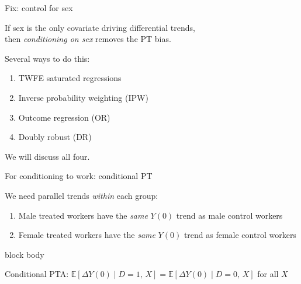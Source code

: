 \documentclass[aspectratio=169,11pt]{beamer}
\newcommand{\emphbox}[1]{%
  \begin{beamercolorbox}[rounded=true,sep=7pt,wd=\linewidth]{block body}%
    \small\color{slate}\raggedright #1%
  \end{beamercolorbox}}
\begin{document}
\begin{frame}{Fix: control for sex}
\vspace{0.6em}
\begin{center}
If sex is the only covariate driving differential trends,\\
then \emph{conditioning on sex} removes the PT bias.
\end{center}
\vspace{0.6em}
\begin{center}
Several ways to do this:
\end{center}
\vspace{0.3em}
\begin{enumerate}\setlength\itemsep{0.4em}
  \item TWFE saturated regressions
  \item Inverse probability weighting (IPW)
  \item Outcome regression (OR)
  \item Doubly robust (DR)
\end{enumerate}
\vspace{0.5em}
\begin{center}\color{warmgray}\small
We will discuss all four.
\end{center}
\end{frame}

\begin{frame}{For conditioning to work: conditional PT}
\vspace{0.6em}
\begin{center}
We need parallel trends \emph{within} each group:
\end{center}
\vspace{0.4em}
\begin{enumerate}\setlength\itemsep{0.5em}
  \item Male treated workers have the \emph{same} $Y(0)$ trend as male control workers
  \item Female treated workers have the \emph{same} $Y(0)$ trend as female control workers
\end{enumerate}
\vspace{0.6em}
\emphbox{Conditional PTA: \;\;
$\mathbb{E}[\Delta Y(0)\mid D{=}1,\,X] = \mathbb{E}[\Delta Y(0)\mid D{=}0,\,X]$
\quad for all $X$}
\end{frame}

\end{document}
